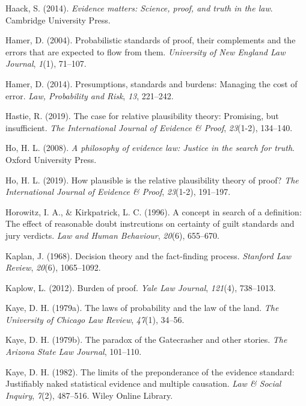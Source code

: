 \documentclass[10pt,dvipsnames]{scrartcl}
\begin{document}
\hypertarget{ref-Haack2014-HAAEMS}{}
Haack, S. (2014). \emph{Evidence matters: Science, proof, and truth in
the law}. Cambridge University Press.

\hypertarget{ref-hamer2004}{}
Hamer, D. (2004). Probabilistic standards of proof, their complements
and the errors that are expected to flow from them. \emph{University of
New England Law Journal}, \emph{1}(1), 71--107.

\hypertarget{ref-hamer2014}{}
Hamer, D. (2014). Presumptions, standards and burdens: Managing the cost
of error. \emph{Law, Probability and Risk}, \emph{13}, 221--242.

\hypertarget{ref-hastie2019CaseRelativePlausibilitya}{}
Hastie, R. (2019). The case for relative plausibility theory: Promising,
but insufficient. \emph{The International Journal of Evidence \& Proof},
\emph{23}(1-2), 134--140.

\hypertarget{ref-ho2008philosophy}{}
Ho, H. L. (2008). \emph{A philosophy of evidence law: Justice in the
search for truth}. Oxford University Press.

\hypertarget{ref-lai2019HowPlausibleRelative}{}
Ho, H. L. (2019). How plausible is the relative plausibility theory of
proof? \emph{The International Journal of Evidence \& Proof},
\emph{23}(1-2), 191--197.

\hypertarget{ref-Horowitz1996}{}
Horowitz, I. A., \& Kirkpatrick, L. C. (1996). A concept in search of a
definition: The effect of reasonable doubt instrcutions on certainty of
guilt standards and jury verdicts. \emph{Law and Human Behaviour},
\emph{20}(6), 655--670.

\hypertarget{ref-Kaplan1968decision}{}
Kaplan, J. (1968). Decision theory and the fact-finding process.
\emph{Stanford Law Review}, \emph{20}(6), 1065--1092.

\hypertarget{ref-kaplow2012}{}
Kaplow, L. (2012). Burden of proof. \emph{Yale Law Journal},
\emph{121}(4), 738--1013.

\hypertarget{ref-kaye79}{}
Kaye, D. H. (1979a). The laws of probability and the law of the land.
\emph{The University of Chicago Law Review}, \emph{47}(1), 34--56.

\hypertarget{ref-Kaye79gate}{}
Kaye, D. H. (1979b). The paradox of the Gatecrasher and other stories.
\emph{The Arizona State Law Journal}, 101--110.

\hypertarget{ref-kaye1982limits}{}
Kaye, D. H. (1982). The limits of the preponderance of the evidence
standard: Justifiably naked statistical evidence and multiple causation.
\emph{Law \& Social Inquiry}, \emph{7}(2), 487--516. Wiley Online
Library.
\end{document}
